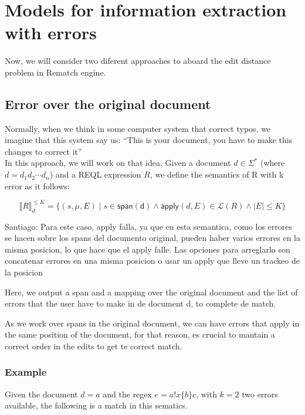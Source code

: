 \documentclass{article}
\begin{document}
\section{Models for information extraction with errors}

Now, we will consider two diferent approaches to aboard the edit distance problem in Rematch engine. 

\subsection{Error over the original document}

Normally, when we think in some computer system that correct typos, we imagine that this system say us: ``This is your document, you have to make this changes to correct it''\\

In this approach, we will work on that idea. Given a document $d \in \Sigma^*$ (where $d = d_1d_2\cdots d_n$) and a REQL expression $R$, we define the semantics of R with k error as it follows:

\[ \llbracket R \rrbracket^{\leq K}_d = \{(s, \mu, E) \; | \; s \in\mathsf{span(d)} \land \mathsf{apply}(d, E) \in \mathcal{L}(R) \land |E| \leq K \}\]


\begin{notabox}
Santiago: Para este caso, apply falla, ya que en esta semantica, como los errores se hacen sobre los spans del documento original, pueden haber varios errores en la misma posicion, lo que hace que el apply falle. Las opciones para arreglarlo son concatenar errores en una misma posicion o usar un apply que lleve un trackeo de la posicion
\end{notabox}


Here, we output a span and a mapping over the original document and the list of errors that the user have to make in de document d, to complete de match.

As we work over spans in the original document, we can have errors that apply in the same position of the document, for that reason, es crucial to mantain a correct order in the edits to get te correct match.

\subsubsection{Example}


Given the document $d = a$ and the regex $e = a!x\{b\}c$, with $k = 2$ two errors available, the following is a match in this sematics.
\end{document}
